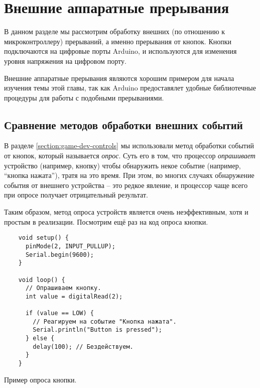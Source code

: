 \documentclass[../sparc.tex]{subfiles}
\begin{document}
\section{Внешние аппаратные прерывания}
\label{section:external-hardware-interrupts}

В данном разделе мы рассмотрим обработку внешних (по отношению к
микроконтроллеру) прерываний, а именно прерывания от кнопок.  Кнопки
подключаются на цифровые порты Arduino, и используются для изменения уровня
напряжения на цифровом порту.

Внешние аппаратные прерывания являются хорошим примером для начала изучения темы
этой главы, так как Arduino предоставялет удобные библиотечные процедуры для
работы с подобными прерываниями.

\subsection{Сравнение методов обработки внешних событий}
\label{subsection:external-interrupt-handling-methods}

В разделе \ref{section:game-dev-controls} мы использовали метод обработки
событий от кнопок, который называется \emph{опрос}.  Суть его в том, что
процессор \emph{опрашивает} устройство (например, кнопку) чтобы обнаружить некое
событие (например, ``кнопка нажата''), тратя на это время.  При этом, во многих
случаях обнаружение события от внешнего устройства -- это редкое явление, и
процессор чаще всего при опросе получает отрицательный результат.

Таким образом, метод опроса устройств является очень неэффективным, хотя и
простым в реализации.  Посмотрим ещё раз на код опроса кнопки.

\begin{listing}[H]
  \begin{verbatim}
    void setup() {
      pinMode(2, INPUT_PULLUP);
      Serial.begin(9600);
    }

    void loop() {
      // Опрашиваем кнопку.
      int value = digitalRead(2);

      if (value == LOW) {
        // Реагируем на событие "Кнопка нажата".
        Serial.println("Button is pressed");
      } else {
        delay(100); // Бездействуем.
      }
    }
  \end{verbatim}
  \caption{Пример опроса кнопки.}
  \label{listing:interrupts-polling-example}
\end{listing}
\end{document}

